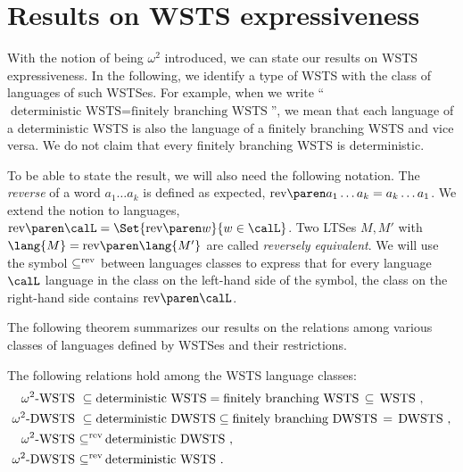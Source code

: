 \documentclass[../../diss.tex]{subfiles}
\begin{document}
\section{Results on WSTS expressiveness}%
\label{Section:WSTSExpressiveness}%

With the notion of being $\omega^2$ introduced, we can state our results on WSTS expressiveness.
In the following, we identify a type of WSTS with the class of languages of such WSTSes.
For example, when we write \enquote{$\text{deterministic WSTS} =  \text{finitely branching WSTS}$}, we mean that each language of a deterministic WSTS is also the language of a finitely branching WSTS and vice versa.
We do not claim that every finitely branching WSTS is deterministic.

To be able to state the result, we will also need the following notation.
The \emph{reverse} of a word $a_1 \ldots a_k$ is defined as expected, $\rev{a_1 \ldots a_k} = a_k \ldots a_1$.
We extend the notion to languages, $\rev{\calL} = \Set{ \rev{w} }{ w  \in \calL}$.
Two LTSes $M,M'$ with $\lang{M} = \rev{\lang{M'}}$ are called \emph{reversely
equivalent}.
We will use the symbol ${\mathrel{\subseteq^{\text{rev}}}}$ between languages classes to express that for every language $\calL$ language in the class on the left-hand side of the symbol, the class on the right-hand side contains $\rev{\calL}$.

The following theorem summarizes our results on the relations among various classes of languages defined by WSTSes and their restrictions.

\begin{theorem}%
\label{Theorem:WSTSExpressiveness}
    The following relations hold among the WSTS language classes:
    \begin{align*}
        \text{$\omega^2$-WSTS} \ & \subseteq  \text{deterministic WSTS}
        =  \text{finitely branching WSTS} \, \subseteq \, \text{WSTS}
        \ ,
        \\
        \text{$\omega^2$-DWSTS} \ &\subseteq  \text{deterministic DWSTS}
        \subseteq  \text{finitely branching DWSTS} \, = \, \text{DWSTS}
        \ ,
        \\
        \text{$\omega^2$-WSTS} \ & {\mathrel{\subseteq^{\text{rev}}}} \, \text{deterministic DWSTS}
        \ ,
        \\
        \text{$\omega^2$-DWSTS} \ & {\mathrel{\subseteq^{\text{rev}}}} \,  \text{deterministic WSTS}
        \ .
    \end{align*}
\end{theorem}
\end{document}
